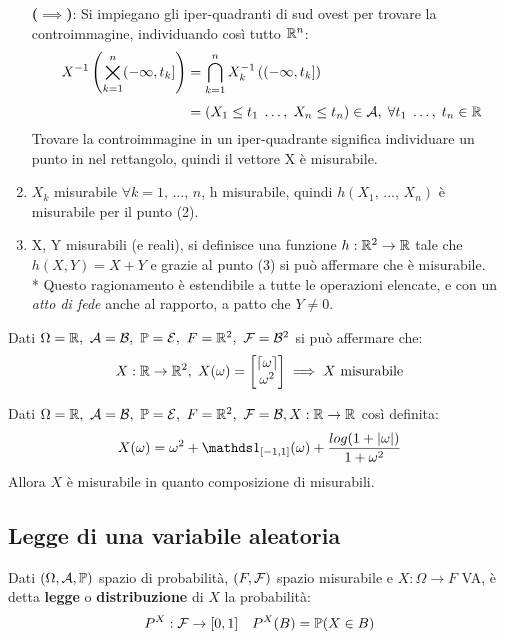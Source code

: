 \begin{dimo}
\begin{enumerate}
      \textbf{($\implies$)}:
      Si impiegano gli iper-quadranti di sud ovest per trovare la controimmagine, individuando così tutto $\mathbb R^n$:
      \begin{align*}
        X^{-1}\left( \bigtimes\limits_{k=1}^{n} (-\infty, t_k] \right) &= \bigcap\limits_{k=1}^n X_k^{-1} \left((-\infty, t_k] \right)\\[4pt]
        &= (X_1 \leq t_1\; \dots, \;X_n \leq t_n) \in \mathcal A, \; \forall t_1\; \dots, \;t_n \in \mathbb R
      \end{align*}
      Trovare la controimmagine in un iper-quadrante significa individuare
      un punto in nel rettangolo, quindi il vettore X è misurabile.

    \item $X_k$ misurabile $\forall k = 1,\, \dots, \, n$,  h misurabile, quindi $h(X_1,\, \dots, \, X_n)$ è misurabile per il punto (2).

    \item X, Y misurabili (e reali), si definisce una funzione $h: \mathbb R^2 \to \mathbb R$ tale che $h(X,Y) = X + Y$ e grazie al punto (3) si può affermare che è misurabile.\\*
    Questo ragionamento è estendibile a tutte le operazioni elencate, e con un \emph{atto di fede} anche al rapporto, a patto che $Y \neq 0$. \qedhere
  \end{enumerate}
\end{dimo}

\medskip
\begin{ese}
  Dati $\Omega = \mathbb R, \ \mathcal A = \mathcal B, \ \mathbb P = \mathcal E, \ F  = \mathbb R^2, \ \mathcal F = \mathcal B^2$ si può affermare che:
  $$X:\mathbb R \to \mathbb R^2,\; X(\omega) = \begin{bmatrix}\lceil\omega\rceil \\ \omega^2 \end{bmatrix} \implies X \text{ misurabile}$$
\end{ese}

\begin{ese}
  Dati $\Omega = \mathbb R, \ \mathcal A = \mathcal B, \ \mathbb P = \mathcal E, \ F  = \mathbb R^2, \ \mathcal F = \mathcal B, X:\mathbb R \to \mathbb R$ così definita:
  $$X(\omega) = \omega^2 + \Ind_{[-1,1]}(\omega) + \frac{log(1+|\omega|)}{1+\omega^2}$$
  Allora $X$ è misurabile in quanto composizione di misurabili.
\end{ese}

\subsection{Legge di una variabile aleatoria}
\begin{defn}
  Dati $(\Omega, \mathcal A, \mathbb P)$ spazio di probabilità, $(F, \mathcal F)$ spazio misurabile e $X:\Omega \to F$ VA,
  è detta \textbf{legge} o \textbf{distribuzione} di $X$ la probabilità:
  $$
    P^X:\mathcal F \to [0,1] \quad P^X(B) = \mathbb P(X \in B)
  $$
\end{defn}

